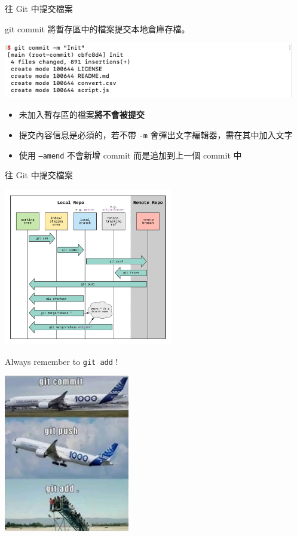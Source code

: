 \documentclass[xetex, unicode, 10pt, aspectratio=169]{beamer}
\begin{document}
\begin{frame}[fragile]{往 Git 中提交檔案}
    \begin{block}{git commit}
        將暫存區中的檔案提交本地倉庫存檔。
        \begin{center}
            \includegraphics[width=5in]{./img/git-commit.png}
        \end{center}
        \begin{itemize}
            \item 未加入暫存區的檔案\textbf{將不會被提交}
            \item 提交內容信息是必須的，若不帶 \texttt{-m} 會彈出文字編輯器，需在其中加入文字
            \item 使用 \texttt{--amend} 不會新增 commit 而是追加到上一個 commit 中
        \end{itemize}
    \end{block}
\end{frame}

\begin{frame}{往 Git 中提交檔案}
    \begin{center}
        \includegraphics[height=2.7in]{./img/git-workflow.png}
    \end{center}
\end{frame}

\begin{frame}{Always remember to \texttt{git add} !}
    \begin{center}
        \includegraphics[height=2.7in]{./img/always-remember-git-add.png}
    \end{center}
\end{frame}
\end{document}
